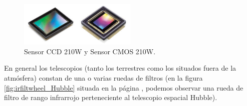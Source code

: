 	\begin{figure}
		\centering
		\includegraphics[width=0.5\textwidth]{images/ccd_and_cmos_sensors_210w.png}
		\caption{\label{fig:SensorCCD}{\small Sensor CCD 210W y Sensor CMOS 210W.}}
	\end{figure}
	En general los telescopios (tanto los terrestres como los situados fuera de la atmósfera) constan de una o varias ruedas de filtros (en la figura \ref{fig:irfiltwheel_Hubble} situada en la página \pageref{fig:irfiltwheel_Hubble}, podemos observar una rueda de filtro de rango infrarrojo perteneciente al telescopio espacial Hubble).
